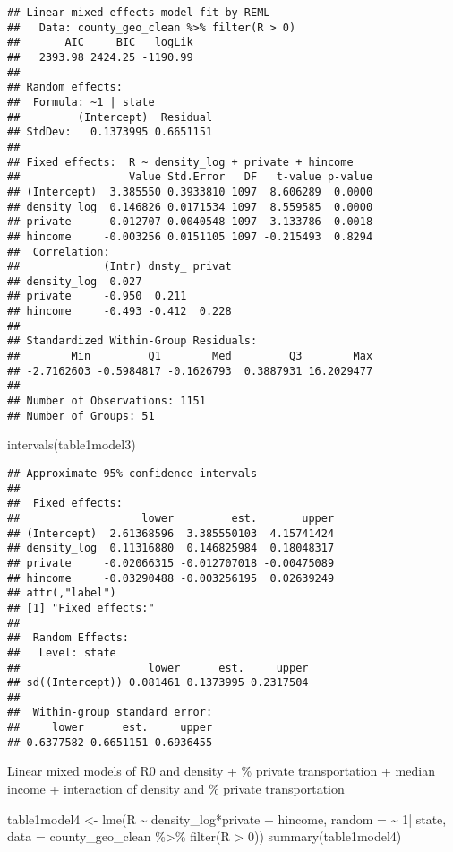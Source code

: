\documentclass[10pt,letterpaper]{article}
\newenvironment{Shaded}{\begin{snugshade}}{\end{snugshade}}
\newcommand{\AttributeTok}[1]{\textcolor[rgb]{0.77,0.63,0.00}{#1}}
\newcommand{\DecValTok}[1]{\textcolor[rgb]{0.00,0.00,0.81}{#1}}
\newcommand{\FunctionTok}[1]{\textcolor[rgb]{0.00,0.00,0.00}{#1}}
\newcommand{\NormalTok}[1]{#1}
\newcommand{\OtherTok}[1]{\textcolor[rgb]{0.56,0.35,0.01}{#1}}
\newcommand{\SpecialCharTok}[1]{\textcolor[rgb]{0.00,0.00,0.00}{#1}}
\begin{document}
\begin{verbatim}
## Linear mixed-effects model fit by REML
##   Data: county_geo_clean %>% filter(R > 0) 
##       AIC     BIC   logLik
##   2393.98 2424.25 -1190.99
## 
## Random effects:
##  Formula: ~1 | state
##         (Intercept)  Residual
## StdDev:   0.1373995 0.6651151
## 
## Fixed effects:  R ~ density_log + private + hincome 
##                 Value Std.Error   DF   t-value p-value
## (Intercept)  3.385550 0.3933810 1097  8.606289  0.0000
## density_log  0.146826 0.0171534 1097  8.559585  0.0000
## private     -0.012707 0.0040548 1097 -3.133786  0.0018
## hincome     -0.003256 0.0151105 1097 -0.215493  0.8294
##  Correlation: 
##             (Intr) dnsty_ privat
## density_log  0.027              
## private     -0.950  0.211       
## hincome     -0.493 -0.412  0.228
## 
## Standardized Within-Group Residuals:
##        Min         Q1        Med         Q3        Max 
## -2.7162603 -0.5984817 -0.1626793  0.3887931 16.2029477 
## 
## Number of Observations: 1151
## Number of Groups: 51
\end{verbatim}

\begin{Shaded}
\begin{Highlighting}[]
\FunctionTok{intervals}\NormalTok{(table1model3)}
\end{Highlighting}
\end{Shaded}

\begin{verbatim}
## Approximate 95% confidence intervals
## 
##  Fixed effects:
##                   lower         est.       upper
## (Intercept)  2.61368596  3.385550103  4.15741424
## density_log  0.11316880  0.146825984  0.18048317
## private     -0.02066315 -0.012707018 -0.00475089
## hincome     -0.03290488 -0.003256195  0.02639249
## attr(,"label")
## [1] "Fixed effects:"
## 
##  Random Effects:
##   Level: state 
##                    lower      est.     upper
## sd((Intercept)) 0.081461 0.1373995 0.2317504
## 
##  Within-group standard error:
##     lower      est.     upper 
## 0.6377582 0.6651151 0.6936455
\end{verbatim}

Linear mixed models of R0 and density + \% private transportation +
median income + interaction of density and \% private transportation

\begin{Shaded}
\begin{Highlighting}[]
\NormalTok{table1model4 }\OtherTok{\textless{}{-}} \FunctionTok{lme}\NormalTok{(R }\SpecialCharTok{\textasciitilde{}}\NormalTok{ density\_log}\SpecialCharTok{*}\NormalTok{private }\SpecialCharTok{+}\NormalTok{ hincome, }
                    \AttributeTok{random =} \SpecialCharTok{\textasciitilde{}} \DecValTok{1}\SpecialCharTok{|}\NormalTok{ state, }
                    \AttributeTok{data =}\NormalTok{ county\_geo\_clean }\SpecialCharTok{\%\textgreater{}\%}
                      \FunctionTok{filter}\NormalTok{(R }\SpecialCharTok{\textgreater{}} \DecValTok{0}\NormalTok{))}
\FunctionTok{summary}\NormalTok{(table1model4)}
\end{Highlighting}
\end{Shaded}
\end{document}
